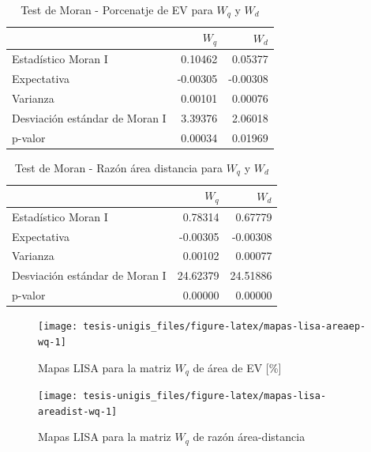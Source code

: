 \documentclass[12pt,a4paper,oneside, openany]{book}
\theoremstyle{definition}
\theoremstyle{definition}
\theoremstyle{definition}
\theoremstyle{remark}
\begin{document}
\begin{table}[H]

\caption{\label{tab:moran-areaep-w}Test de Moran - Porcenatje de EV para $W_q$ y $W_d$}
\centering
\begin{tabular}{lrr}
\toprule
  & $W_q$ & $W_d$\\
\midrule
Estadístico Moran I & 0.10462 & 0.05377\\
Expectativa & -0.00305 & -0.00308\\
Varianza & 0.00101 & 0.00076\\
Desviación estándar de Moran I & 3.39376 & 2.06018\\
p-valor & 0.00034 & 0.01969\\
\bottomrule
\end{tabular}
\end{table}

\begin{table}[H]

\caption{\label{tab:moran-areadist-w}Test de Moran - Razón área distancia para $W_{q}$ y $W_{d}$}
\centering
\begin{tabular}{lrr}
\toprule
  & $W_{q}$ & $W_{d}$\\
\midrule
Estadístico Moran I & 0.78314 & 0.67779\\
Expectativa & -0.00305 & -0.00308\\
Varianza & 0.00102 & 0.00077\\
Desviación estándar de Moran I & 24.62379 & 24.51886\\
p-valor & 0.00000 & 0.00000\\
\bottomrule
\end{tabular}
\end{table}

\begin{figure}[H]

{\centering \texttt{[image: tesis-unigis\_files/figure-latex/mapas-lisa-areaep-wq-1]} 

}

\caption{Mapas LISA para la matriz $W_q$ de área de EV [\%]}\label{fig:mapas-lisa-areaep-wq}
\end{figure}

\begin{figure}[H]

{\centering \texttt{[image: tesis-unigis\_files/figure-latex/mapas-lisa-areadist-wq-1]} 

}

\caption{Mapas LISA para la matriz $W_q$ de razón área-distancia}\label{fig:mapas-lisa-areadist-wq}
\end{figure}
\end{document}
